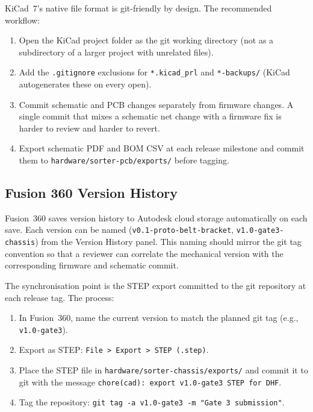 KiCad~7's native file format is git-friendly by design.
The recommended workflow:

\begin{enumerate}
  \item Open the KiCad project folder as the git working directory (not as a subdirectory
        of a larger project with unrelated files).
  \item Add the \texttt{.gitignore} exclusions for \texttt{*.kicad\_prl} and
        \texttt{*-backups/} (KiCad autogenerates these on every open).
  \item Commit schematic and PCB changes separately from firmware changes.
        A single commit that mixes a schematic net change with a firmware fix is harder to
        review and harder to revert.
  \item Export schematic PDF and BOM CSV at each release milestone and commit them to
        \texttt{hardware/sorter-pcb/exports/} before tagging.
\end{enumerate}

\subsection{Fusion 360 Version History}
\label{subsec:ch13-fusion360}

Fusion~360 saves version history to Autodesk cloud
storage automatically on each save.
Each version can be named (\texttt{v0.1-proto-belt-bracket}, \texttt{v1.0-gate3-chassis})
from the Version History panel.
This naming should mirror the git tag convention so that a reviewer can correlate the
mechanical version with the corresponding firmware and schematic commit.

The synchronisation point is the STEP export committed to the git repository at each
release tag.
The process:
\begin{enumerate}
  \item In Fusion~360, name the current version to match the planned git tag
        (e.g., \texttt{v1.0-gate3}).
  \item Export as STEP: \texttt{File > Export > STEP (.step)}.
  \item Place the STEP file in \texttt{hardware/sorter-chassis/exports/} and commit it
        to git with the message \texttt{chore(cad): export v1.0-gate3 STEP for DHF}.
  \item Tag the repository: \texttt{git tag -a v1.0-gate3 -m "Gate 3 submission"}.
\end{enumerate}

